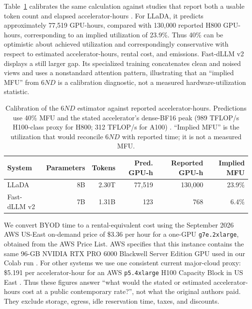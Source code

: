 \documentclass{article}
\begin{document}
Table~\ref{tab:compute-calibration} calibrates the same calculation against studies that report both a usable token count and elapsed accelerator-hours \citep{nie2025llada,wu2025fastdllmv2}. For LLaDA, it predicts approximately 77,519 GPU-hours, compared with 130,000 reported H800 GPU-hours, corresponding to an implied utilization of 23.9\%. Thus 40\% can be optimistic about achieved utilization and correspondingly conservative with respect to estimated accelerator-hours, rental cost, and emissions. Fast-dLLM v2 displays a still larger gap. Its specialized training concatenates clean and noised views and uses a nonstandard attention pattern, illustrating that an ``implied MFU'' from $6ND$ is a calibration diagnostic, not a measured hardware-utilization statistic.

\begin{table}[!htbp]
\caption{Calibration of the $6ND$ estimator against reported accelerator-hours. Predictions use 40\% MFU and the stated accelerator's dense-BF16 peak (989 TFLOP/s H100-class proxy for H800; 312 TFLOP/s for A100) \citep{nvidiaH100,nvidiaA100}. ``Implied MFU'' is the utilization that would reconcile $6ND$ with reported time; it is not a measured MFU.}
\label{tab:compute-calibration}
\centering
\small
\begin{tabular}{lrrrrr}
\toprule
System & Parameters & Tokens & Pred. GPU-h & Reported GPU-h & Implied MFU \\
\midrule
LLaDA & 8B & 2.30T & 77,519 & 130,000 & 23.9\% \\
Fast-dLLM v2 & 7B & 1.31B & 123 & 768 & 6.4\% \\
\bottomrule
\end{tabular}
\end{table}

We convert BYOD time to a rental-equivalent cost using the September 2026 AWS US-East on-demand price of \$3.36 per hour for a one-GPU \texttt{g7e.2xlarge}, obtained from the AWS Price List. AWS specifies that this instance contains the same 96-GB NVIDIA RTX PRO 6000 Blackwell Server Edition GPU used in our Colab run \citep{awsPriceListG7e2026,awsG7e2026}. For other systems we use one consistent current major-cloud proxy: \$5.191 per accelerator-hour for an AWS \texttt{p5.4xlarge} H100 Capacity Block in US East \citep{awsCapacity2026}. Thus these figures answer ``what would the stated or estimated accelerator-hours cost at a public contemporary rate?'', not what the original authors paid. They exclude storage, egress, idle reservation time, taxes, and discounts.
\end{document}
